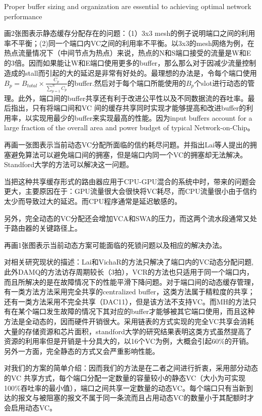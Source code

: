 ﻿\documentclass[10pt,journal]{IEEEtran}
\begin{document}
Proper buffer sizing and organization are essential to achieving optimal network performance

画2张图表示静态缓存分配存在的问题：（1）3x3 mesh的例子说明端口之间的利用率不平衡；(2)同一个端口内VC之间的利用率不平衡。以3x3的mesh网络为例，在热点流量情况下（中间节点为热点）来说，热点的N和S端口接受的流量是W和E的3倍。因而如果能让W和E端口使用更多的buffer，那么那么对于因减少流量控制造成的stall而引起的大的延迟是非常有好处的。最理想的办法是，令每个端口使用$B_p=B_{total}\times\frac{C_p}{\sum_{p=1}^NC_p}$的buffer.然后对于每个端口所能使用的$B_p$个slot进行动态的管理。此外，端口间的buffer共享还有利于改进公平性以及不同数据流的吞吐率。最后指出，只有将端口间和VC 间的缓存共享同时实现才能够提高和改进buffer的利用率，以实现用最少的buffer来实现最高的性能。因为input buffers account for a large fraction of the overall area and power budget of typical Network-on-Chip。

再画一张图表示当前动态VC分配所面临的信约耗尽问题。并指出Lai等人提出的拥塞避免算法可以避免端口间的拥塞，但是端口内同一个VC的拥塞却无法解决。Standford大学的方法可以解决这一问题。

当把这种共享缓存形式的路由器应用于CPU-GPU混合的系统中时，带来的问题会更大，主要原因在于：GPU流量很大会很快将VC耗尽，而CPU流量很小由于信约太少而导致过大的延迟。而CPU程序通常是延迟敏感的。

另外，完全动态的VC分配还会增加VCA和SWA的压力，而这两个流水段通常又处于路由器的关键路径上。

再画1张图表示当前动态方案可能面临的死锁问题以及相应的解决办法。

对相关研究现状的描述：Lai和VichaR的方法只解决了端口内的VC动态分配问题,此外DAMQ的方法访存周期较长（3拍），VCR的方法也只适用于同一个端口内，而且所解决的是在故障情况下的性能平滑下降问题。对于端口间的动态缓存管理，有一类方法方法采用完全共享的centralized buffer，这类方法属于精粒度的共享；还有一类方法采用不完全共享（DAC11），但是该方法不支持VC。而MH的方法只有在某个端口发生故障的情况下其对应的buffer才能够被其它端口使用，而且这种方法是全动态的，因而硬件开销很大。采用链表的方式实现的完全VC共享会消耗大量的存储资源和芯片面积，standford大学的研究结果表明这类方式虽然提高了资源的利用率但是开销是十分具大的，以16个VC为例，大概会引起60\%的开销。另外一方面，完全静态的方式又会严重影响性能。

对我们的方案的简单介绍：因而我们的方法是在二者之间进行折衷，采用部分动态的VC 共享方式，每个端口分配一定数量的容量较小的静态VC（大小为可实现100\%吞吐率的最小值），端口之间共享一定数量的动态VC。每个端口只有当新到达的报文与被阻塞的报文不属于同一条流而且占用动态VC的数量小于其配额时才会启用动态VC。
\end{document}
